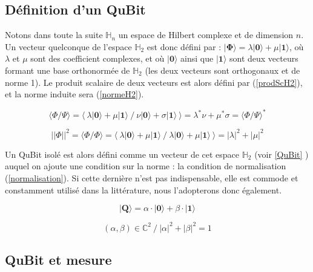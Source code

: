 \documentclass[a4paper,12pt]{report}
\newcommand{\prodSc}[2]{\langle #1 / #2 \rangle}
\newcommand{\quSt}[1]{\bm{|#1\rangle}}
\begin{document}
		\subsection{Définition d'un QuBit}

\par{
	Notons dans toute la suite $\mathbb{H}_{n}$ un espace de Hilbert complexe et de dimension $n$. Un vecteur quelconque de l'espace $\mathbb{H}_{2}$ est donc défini par : $\quSt{\Phi} = \lambda \quSt{0} + \mu \quSt{1}$, où $\lambda$ et $\mu$ sont des coefficient complexes, et où $\quSt{0}$ ainsi que $\quSt{1} $ sont deux vecteurs formant une base orthonormée de $\mathbb{H}_{2}$ (les deux vecteurs sont orthogonaux et de norme 1). Le produit scalaire de deux vecteurs est alors défini par (\ref{prodScH2}), et la norme induite sera (\ref{normeH2}).
}

\begin{equation} \label{prodScH2}
	 \prodSc{\Phi}{\Psi} = \langle ~ \lambda \quSt{0} + \mu \quSt{1} ~/~ \nu \quSt{0} + \sigma \quSt{1} ~\rangle = \lambda^* \nu + \mu^* \sigma = \prodSc{\Phi}{\Psi}^*
\end{equation}

\begin{equation} \label{normeH2}
	 || \Phi ||^2 = \prodSc{\Phi}{\Phi} = \langle ~ \lambda \quSt{0} + \mu \quSt{1} ~/~ \lambda \quSt{0} + \mu \quSt{1} ~\rangle = |\lambda|^2 + |\mu|^2
\end{equation}

\vspace{1\baselineskip}

\par{
	Un QuBit isolé est alors défini comme un vecteur de cet espace $\mathbb{H}_{2}$ (voir \ref{QuBit} ) auquel on ajoute une condition sur la norme : la condition de normalisation (\ref{normalisation}). Si cette dernière n'est pas indispensable, elle est commode et constamment utilisé dans la littérature, nous l'adopterons donc également.
}

\begin{equation} \label{QuBit}
	\quSt{Q} = \alpha \cdot \quSt{0} + \beta \cdot \quSt{1}
\end{equation}

\begin{equation} \label{normalisation}
	(\alpha,\beta) \in \mathbb{C}^2 ~/~ |\alpha|^2 + |\beta|^2 = 1
\end{equation}

		\subsection{QuBit et mesure}
\end{document}
